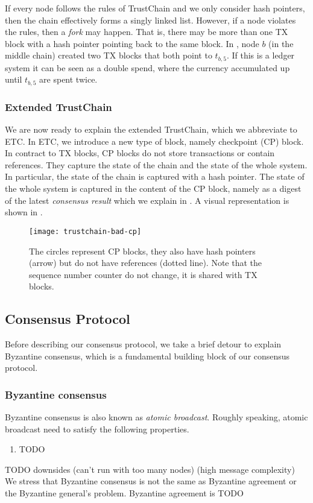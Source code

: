 If every node follows the rules of TrustChain and we only consider hash pointers,
then the chain effectively forms a singly linked list.
However, if a node violates the rules, then a \emph{fork} may happen.
That is, there may be more than one TX block with a hash pointer pointing back to the same block.
In , node $b$ (in the middle chain) created two TX blocks that both point to $t_{b, 5}$.
If this is a ledger system it can be seen as a double spend, where the currency accumulated up until $t_{b, 5}$ are spent twice.

\subsubsection*{Extended TrustChain}
We are now ready to explain the extended TrustChain, which we abbreviate to ETC.
In ETC, we introduce a new type of block, namely checkpoint (CP) block.
In contract to TX blocks, CP blocks do not store transactions or contain references.
They capture the state of the chain and the state of the whole system.
In particular, the state of the chain is captured with a hash pointer.
The state of the whole system is captured in the content of the CP block,
namely as a digest of the latest \emph{consensus result} which we explain in .
A visual representation is shown in .

\begin{figure}
    \texttt{[image: trustchain-bad-cp]}
    \centering
    \caption{The circles represent CP blocks,
    they also have hash pointers (arrow) but do not have references (dotted line).
    Note that the sequence number counter do not change, it is shared with TX blocks.}
    \label{fig:trustchain-bad-cp}
\end{figure}

\subsection{Consensus Protocol}\label{sec:overview-cons}
Before describing our consensus protocol, we take a brief detour to explain Byzantine consensus,
which is a fundamental building block of our consensus protocol.

\subsubsection*{Byzantine consensus}
Byzantine consensus is also known as \emph{atomic broadcast}.
Roughly speaking, atomic broadcast need to satisfy the following properties.
\begin{enumerate}
\item TODO
\end{enumerate}
TODO downsides (can't run with too many nodes) (high message complexity)
We stress that Byzantine consensus is not the same as Byzantine agreement or the Byzantine general's problem.
Byzantine agreement is TODO

